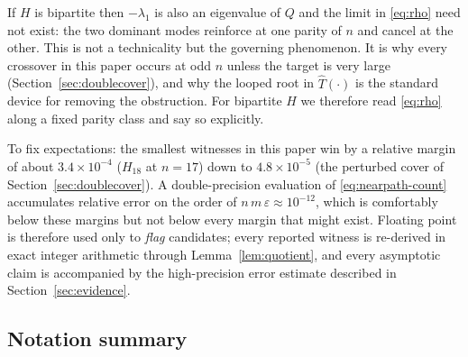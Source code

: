 \begin{remark}
  \label{rem:bipartite-parity}
  If $H$ is bipartite then $-\lambda_1$ is also an eigenvalue of $Q$ and
  the limit in \eqref{eq:rho} need not exist: the two dominant modes
  reinforce at one parity of $n$ and cancel at the other. This is not a
  technicality but the governing phenomenon. It is why every crossover
  in this paper occurs at odd $n$ unless the target is very large
  (Section~\ref{sec:doublecover}), and why the looped root in
  $\hat T(\cdot)$ is the standard device for removing the obstruction.
  For bipartite $H$ we therefore read \eqref{eq:rho} along a fixed
  parity class and say so explicitly.
\end{remark}

\begin{remark}
  \label{rem:margins}
  To fix expectations: the smallest witnesses in this paper win by a
  relative margin of about $3.4 \times 10^{-4}$ ($H_{18}$ at $n = 17$)
  down to $4.8 \times 10^{-5}$ (the perturbed cover of
  Section~\ref{sec:doublecover}). A double-precision evaluation of
  \eqref{eq:nearpath-count} accumulates relative error on the order of
  $n\,m\,\varepsilon \approx 10^{-12}$, which is comfortably below these
  margins but not below every margin that might exist. Floating point is
  therefore used only to \emph{flag} candidates; every reported witness
  is re-derived in exact integer arithmetic through
  Lemma~\ref{lem:quotient}, and every asymptotic claim is accompanied by
  the high-precision error estimate described in
  Section~\ref{sec:evidence}.
\end{remark}

\subsection{Notation summary}

